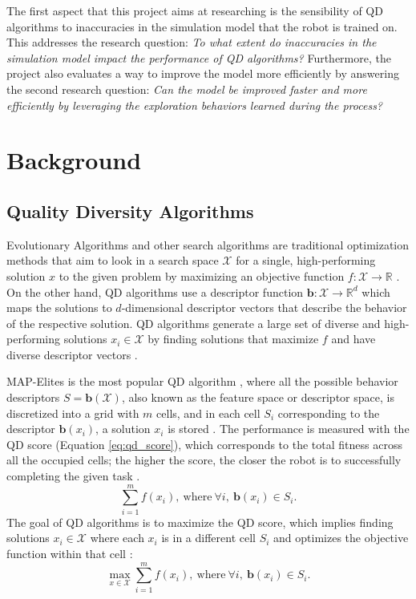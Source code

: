\documentclass[12pt]{article}
\begin{document}
The first aspect that this project aims at researching is the sensibility of QD algorithms to inaccuracies in the simulation model that the robot is trained on. This  addresses the research question: \textit{To what extent do inaccuracies in the simulation model impact the performance of QD algorithms?} Furthermore, the project also evaluates a way to improve the model more efficiently by answering the second research question: \textit{Can the model be improved faster and more efficiently by leveraging the exploration behaviors learned during the process?}
 

\section{Background}
\subsection{Quality Diversity Algorithms}
Evolutionary Algorithms and other search algorithms are traditional optimization methods that aim to look in a search space $\mathcal{X}$ for a single, high-performing solution $x$ to the given problem by maximizing an objective function $f:\mathcal{X} \rightarrow \mathbb{R}$ \citep{qian2024quality}. On the other hand, QD algorithms use a descriptor function $\mathbf{b}:\mathcal{X} \rightarrow \mathbb{R}^{d}$ which maps the solutions to $d$-dimensional descriptor vectors that describe the behavior of the respective solution. QD algorithms generate a large set of diverse and high-performing solutions $x_{i} \in \mathcal{X}$ by finding solutions that maximize $f$ and have diverse descriptor vectors \citep{janmohamed2023improving}. 

MAP-Elites is the most popular QD algorithm \citep{qian2024quality}, where all the possible behavior descriptors $S=\mathbf{b}(\mathcal{X})$, also known as the feature space or descriptor space, is discretized into a grid with $m$ cells, and in each cell $S_i$ corresponding to the descriptor $\mathbf{b}(x_{i})$, a solution $x_i$ is stored \citep{janmohamed2023improving}. The performance is measured with the QD score (Equation \ref{eq:qd_score}), which corresponds to the total fitness across all the occupied cells; the higher the score, the closer the robot is to successfully completing the given task \citep{pugh2015confronting}. 
\begin{equation}
\label{eq:qd_score}
\sum\limits_{i=1}^m f(x_i), \ \text{where} \ \forall i, \ \mathbf{b}(x_i) \in S_i. 
\end{equation}
The goal of QD algorithms is to maximize the QD score, which implies finding solutions $x_{i} \in \mathcal{X}$ where each $x_{i}$ is in a different cell $S_i$ and optimizes the objective function within that cell \citep{pierrot2022multi}:
\begin{equation}
\label{eq:qd_problem}
\max\limits_{x \in \mathcal{X}} \sum\limits_{i=1}^m f(x_i), \ \text{where} \ \forall i, \ \mathbf{b}(x_i) \in S_i. 
\end{equation}
\end{document}
